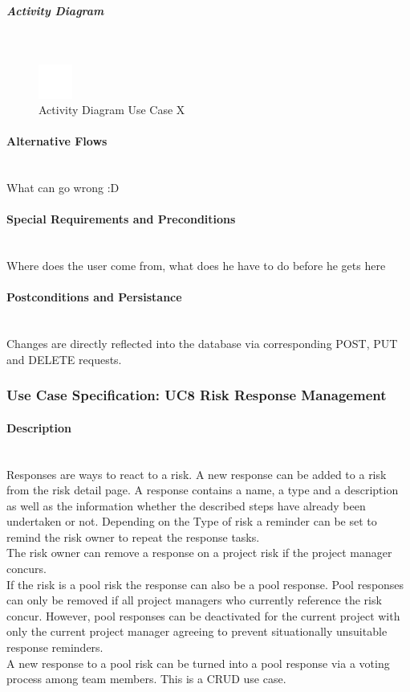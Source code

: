 \subparagraph{Activity Diagram}\mbox{}\\
\begin{figure}[h]
	\centering
	\includegraphics[width=0.1\textwidth]{Content/Domain/placeholder.png}
	\caption{Activity Diagram Use Case X}
	\label{fig:label77}
\end{figure}

\paragraph*{Alternative Flows}\mbox{}\\
What can go wrong :D

\paragraph*{Special Requirements and Preconditions}\mbox{}\\
Where does the user come from, what does he have to do before he gets here

\paragraph*{Postconditions and Persistance}\mbox{}\\
Changes are directly reflected into the database via corresponding POST, PUT and DELETE requests.

\newpage
\subsubsection{Use Case Specification: \ac{UC}8 Risk Response Management}
\label{sec:domainBbi}

\paragraph*{Description}\mbox{}\\
Responses are ways to react to a risk. A new response can be added to a risk from the risk detail page. A response contains a name, a type and a description as well as the information whether the described steps have already been undertaken or not. Depending on the Type of risk a reminder can be set to remind the risk owner to repeat the response tasks.\\
The risk owner can remove a response on a project risk if the project manager concurs.\\
If the risk is a pool risk the response can also be a pool response. Pool responses can only be removed if all project managers who currently reference the risk concur. However, pool responses can be deactivated for the current project with only the current project manager agreeing to prevent situationally unsuitable response reminders.\\
A new response to a pool risk can be turned into a pool response via a voting process among team members.
This is a CRUD use case.

